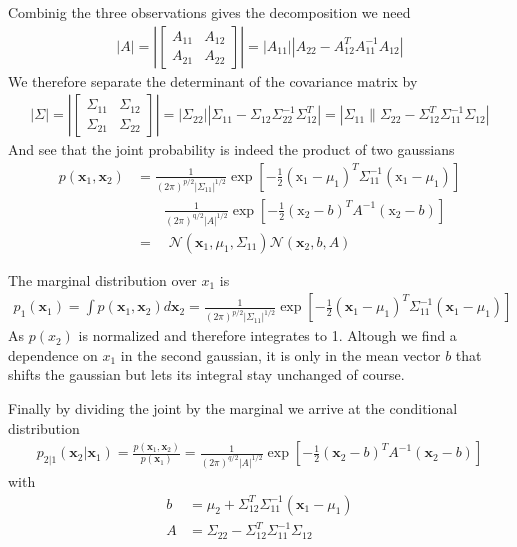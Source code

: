 \documentclass{article}
\begin{document}
Combinig the three observations gives the decomposition we need
\begin{align*}
|A|=\left| \left[ \begin{array}{cc}{A_{11}} & {A_{12}} \\ {A_{21}} & {A_{22}}\end{array}\right]\right| = \left|A_{11} \right| \left| A_{22}-A_{12}^{T} A_{11}^{-1} A_{12}\right|
\end{align*}
We therefore separate the determinant of the covariance matrix by
\begin{align*}
|\Sigma|=\left| \left[ \begin{array}{cc}{\Sigma_{11}} & {\Sigma_{12}} \\ {\Sigma_{21}} & {\Sigma_{22}}\end{array}\right]\right|=| \Sigma_{22}| | \Sigma_{11}-\Sigma_{12} \Sigma_{22}^{-1} \Sigma_{12}^{T}|=| \Sigma_{11} \| \Sigma_{22}-\Sigma_{12}^{T} \Sigma_{11}^{-1} \Sigma_{12} |	
\end{align*}
And see that the joint probability is indeed the product of two gaussians
\begin{align*}
p\left(\mathbf{x}_{1}, \mathbf{x}_{2}\right)&= \frac{1}{(2 \pi)^{p / 2}\left|\Sigma_{11}\right|^{1 / 2}} \exp \left[-\frac{1}{2}\left(\mathrm{x}_{1}-\mu_{1}\right)^{T} \Sigma_{11}^{-1}\left(\mathrm{x}_{1}-\mu_{1}\right)\right] \\
& \quad\quad \frac{1}{(2 \pi)^{\mathrm{q} / 2}|A|^{1 / 2}} \exp \left[-\frac{1}{2}\left(\mathrm{x}_{2}-b\right)^{T} A^{-1}\left(\mathrm{x}_{2}-b\right)\right] \\
&=\quad \mathcal{N}\left(\mathbf{x}_{1}, \mu_{1}, \Sigma_{11}\right) \mathcal{N}\left(\mathbf{x}_{2}, b, A\right)
\end{align*}

\bigbreak
The marginal distribution over $x_1$ is
\begin{align*}
p_{1}\left(\mathbf{x}_{1}\right)=\int p\left(\mathbf{x}_{1}, \mathbf{x}_{2}\right) d \mathbf{x}_{2}=\frac{1}{(2 \pi)^{p / 2}\left|\Sigma_{11}\right|^{1 / 2}} \exp \left[-\frac{1}{2}\left(\mathbf{x}_{1}-\mu_{1}\right)^{T} \Sigma_{11}^{-1}\left(\mathbf{x}_{1}-\mu_{1}\right)\right]
\end{align*}
As $p(x_2)$ is normalized and therefore integrates to 1. Altough we find a dependence on $x_1$ in the second gaussian, it is only in the mean vector $b$ that shifts the gaussian but lets its integral stay unchanged of course. 

Finally by dividing the joint by the marginal we arrive at the conditional distribution
\begin{align*}
p_{2|1}\left(\mathbf{x}_{2} | \mathbf{x}_{1}\right)=\frac{p\left(\mathbf{x}_{1}, \mathbf{x}_{2}\right)}{p\left(\mathbf{x}_{1}\right)}=\frac{1}{(2 \pi)^{q / 2}|A|^{1 / 2}} \exp \left[-\frac{1}{2}\left(\mathbf{x}_{2}-b\right)^{T} A^{-1}\left(\mathbf{x}_{2}-b\right)\right]
\end{align*}
with
\begin{align*}
b&=\mu_{2}+\Sigma_{12}^{T} \Sigma_{11}^{-1}\left(\mathbf{x}_{1}-\mu_{1}\right) \\
A&=\Sigma_{22}-\Sigma_{12}^{T} \Sigma_{11}^{-1} \Sigma_{12}
\end{align*}
\end{document}
